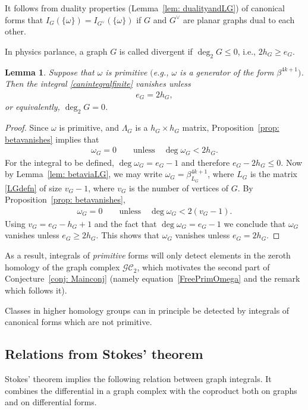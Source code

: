 \documentclass[pdftex]{sigma}%
\newtheorem{lem}[thm]{Lemma}
\numberwithin{equation}{section}
\newcommand{\GC}{\mathcal{GC}}
\newcommand{\0}{\color{blue}{\mathsf{0}}}
\begin{document}
It follows from duality properties (Lemma~\ref{lem: dualityandLG}) of canonical forms that $I_{G}(\{\omega\}) = I_{G^{\vee}}(\{\omega\})$ if $G$ and $G^{\vee}$ are planar graphs dual to each other.

In physics parlance, a graph $G$ is called divergent if $\deg_2 G \leq 0$, i.e., $2 h_G \geq e_G$.

\begin{lem} \label{lem: intGvanishes}
Suppose that $\omega$ is primitive $($e.g., $\omega$ is a generator of the form $\beta^{4k+1})$. Then the integral \eqref{canintegralfinite}
vanishes unless
\begin{gather*}
e_G = 2h_G ,
\end{gather*}
or equivalently, $\deg_2 G =0$.
 \end{lem}
\begin{proof}
 Since $\omega$ is primitive, and $\Lambda_G$ is a $h_G \times h_G$ matrix, Proposition~\ref{prop: betavanishes} implies that
\begin{gather*}
\omega_{G} = 0 \qquad \text{unless}\quad \deg \omega_{G} < 2h_{G} .
\end{gather*}
For the integral to be defined, $\deg \omega_{G} = e_{G}-1$ and therefore
$ e_{G} - 2 h_{G} \leq 0$. Now by Lemma~\ref{lem: betaviaLG}, we may write $\omega_G = \beta^{4k+1}_{L_G}$, where $L_G$ is the matrix \eqref{LGdefn} of size $v_G-1$, where $v_G$ is the number of vertices of $G$. By Proposition~\ref{prop: betavanishes},
\begin{gather*}
\omega_{G} = 0 \qquad \text{unless}\quad \deg \omega_{G} < 2(v_{G}-1) .
\end{gather*}
Using $v_G= e_G-h_G+1$ and the fact that $\deg \omega_{G} = e_{G}-1$ we conclude that $\omega_G$ vanishes unless $e_G\geq 2h_G$. This shows that $\omega_G$ vanishes unless $e_G = 2h_G$.
\end{proof}

As a result, integrals of \emph{primitive} forms will only detect elements in the zeroth homology of the graph complex $\GC_2$, which motivates the second part of Conjecture~\ref{conj: Mainconj} (namely equation~\eqref{FreePrimOmega} and the remark which follows it).

Classes in higher homology groups can in principle be detected by integrals of canonical forms which are not primitive.

\subsection{Relations from Stokes' theorem}
Stokes' theorem implies the following relation between graph integrals. It combines
the diffe\-ren\-tial in a graph complex with the coproduct both on graphs and on differential forms.
\end{document}
